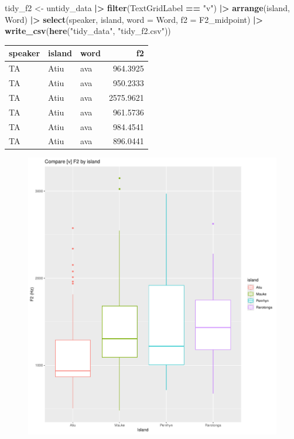 \documentclass[
  ,man,floatsintext]{apa6}
\newenvironment{Shaded}{\begin{snugshade}}{\end{snugshade}}
\newcommand{\AttributeTok}[1]{\textcolor[rgb]{0.13,0.29,0.53}{#1}}
\newcommand{\FunctionTok}[1]{\textcolor[rgb]{0.13,0.29,0.53}{\textbf{#1}}}
\newcommand{\NormalTok}[1]{#1}
\newcommand{\OtherTok}[1]{\textcolor[rgb]{0.56,0.35,0.01}{#1}}
\newcommand{\SpecialCharTok}[1]{\textcolor[rgb]{0.81,0.36,0.00}{\textbf{#1}}}
\newcommand{\StringTok}[1]{\textcolor[rgb]{0.31,0.60,0.02}{#1}}
\begin{document}
\begin{Shaded}
\begin{Highlighting}[]
\NormalTok{tidy\_f2 }\OtherTok{\textless{}{-}}\NormalTok{ untidy\_data }\SpecialCharTok{|\textgreater{}}
  \FunctionTok{filter}\NormalTok{(TextGridLabel }\SpecialCharTok{==} \StringTok{"v"}\NormalTok{) }\SpecialCharTok{|\textgreater{}}
  \FunctionTok{arrange}\NormalTok{(island, Word) }\SpecialCharTok{|\textgreater{}}  
  \FunctionTok{select}\NormalTok{(speaker, island, }\AttributeTok{word =}\NormalTok{ Word, }\AttributeTok{f2 =}\NormalTok{ F2\_midpoint) }\SpecialCharTok{|\textgreater{}}
  \FunctionTok{write\_csv}\NormalTok{(}\FunctionTok{here}\NormalTok{(}\StringTok{"tidy\_data"}\NormalTok{, }\StringTok{"tidy\_f2.csv"}\NormalTok{))}
\end{Highlighting}
\end{Shaded}

\begin{tabular}{l|l|l|r}
\hline
speaker & island & word & f2\\
\hline
TA & Atiu & ava & 964.3925\\
\hline
TA & Atiu & ava & 950.2333\\
\hline
TA & Atiu & ava & 2575.9621\\
\hline
TA & Atiu & ava & 961.5736\\
\hline
TA & Atiu & ava & 984.4541\\
\hline
TA & Atiu & ava & 896.0441\\
\hline
\end{tabular}

\begin{figure}
\includegraphics[width=2700px]{D2_CIM_files/figure-latex/print-f2-plot-1} \caption{ }\label{fig:print-f2-plot}
\end{figure}
\end{document}
